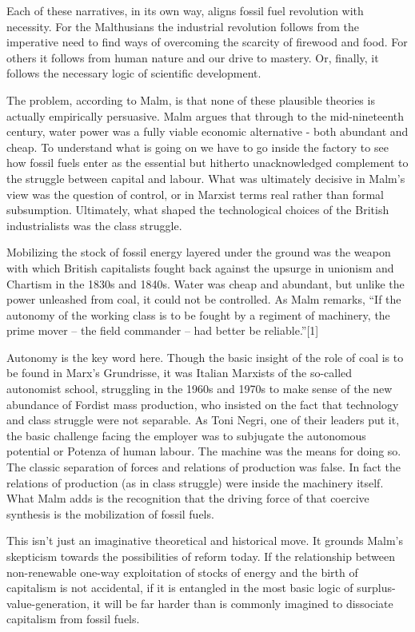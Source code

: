 \documentclass[
]{book}
\begin{document}
Each of these narratives, in its own way, aligns fossil fuel revolution with necessity. For the Malthusians the industrial revolution follows from the imperative need to find ways of overcoming the scarcity of firewood and food. For others it follows from human nature and our drive to mastery. Or, finally, it follows the necessary logic of scientific development.

The problem, according to Malm, is that none of these plausible theories is actually empirically persuasive. Malm argues that through to the mid-nineteenth century, water power was a fully viable economic alternative - both abundant and cheap. To understand what is going on we have to go inside the factory to see how fossil fuels enter as the essential but hitherto unacknowledged complement to the struggle between capital and labour. What was ultimately decisive in Malm's view was the question of control, or in Marxist terms real rather than formal subsumption. Ultimately, what shaped the technological choices of the British industrialists was the class struggle.

Mobilizing the stock of fossil energy layered under the ground was the weapon with which British capitalists fought back against the upsurge in unionism and Chartism in the 1830s and 1840s. Water was cheap and abundant, but unlike the power unleashed from coal, it could not be controlled. As Malm remarks, ``If the autonomy of the working class is to be fought by a regiment of machinery, the prime mover -- the field commander -- had better be reliable.''{[}1{]}

Autonomy is the key word here. Though the basic insight of the role of coal is to be found in Marx's Grundrisse, it was Italian Marxists of the so-called autonomist school, struggling in the 1960s and 1970s to make sense of the new abundance of Fordist mass production, who insisted on the fact that technology and class struggle were not separable. As Toni Negri, one of their leaders put it, the basic challenge facing the employer was to subjugate the autonomous potential or Potenza of human labour. The machine was the means for doing so. The classic separation of forces and relations of production was false. In fact the relations of production (as in class struggle) were inside the machinery itself. What Malm adds is the recognition that the driving force of that coercive synthesis is the mobilization of fossil fuels.

This isn't just an imaginative theoretical and historical move. It grounds Malm's skepticism towards the possibilities of reform today. If the relationship between non-renewable one-way exploitation of stocks of energy and the birth of capitalism is not accidental, if it is entangled in the most basic logic of surplus-value-generation, it will be far harder than is commonly imagined to dissociate capitalism from fossil fuels.
\end{document}
